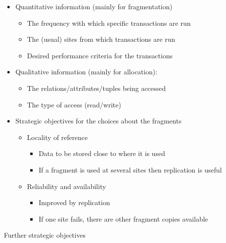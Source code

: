 \documentclass{article}[18pt]
\begin{document}
\begin{itemize}
	\item Quantitative information (mainly for fragmentation)
	\begin{itemize}
		\item The frequency with which specific transactions are run
		\item The (usual) sites from which transactions are run
		\item Desired performance criteria for the transactions
	\end{itemize}
	\item Qualitative information (mainly for allocation):
	\begin{itemize}
		\item The relations/attributes/tuples being accessed
		\item The type of access (read/write)
	\end{itemize}
	\item Strategic objectives for the choices about the fragments
	\begin{itemize}
		\item Locality of reference
		\begin{itemize}
			\item Data to be stored close to where it is used
			\item If a fragment is used at several sites then replication is useful
		\end{itemize}
		\item Reliability and availability
		\begin{itemize}
			\item Improved by replication
			\item If one site fails, there are other fragment copies available
		\end{itemize}
	\end{itemize}
\end{itemize}
Further strategic objectives
\end{document}
